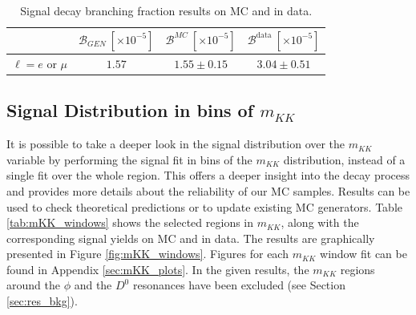 \begin{table}[H]
	\centering
	\begin{tabular}{l|c|c|c}
		& $\mathcal{B}_{GEN}~[\times 10^{-5}]$ & $\mathcal{B}^{MC}~[\times 10^{-5}]$ & $\mathcal{B}^{\mathrm{data}}~[\times 10^{-5}]$ \\
		\toprule
		$\ell = e$ or $\mu$ & $1.57$ & $1.55 \pm 0.15$ & $3.04 \pm 0.51$\\
		\bottomrule
	\end{tabular}
	\captionsetup{width=.8\linewidth}
	\caption{Signal decay branching fraction results on MC and in data.}
	\label{tab:br_result_sig}
\end{table}

\subsection{Signal Distribution in bins of \texorpdfstring{$m_{KK}$}{mKK}}

It is possible to take a deeper look in the signal distribution over the $m_{KK}$ variable by performing the signal fit in bins of the $m_{KK}$ distribution, instead of a single fit over the whole region. This offers a deeper insight into the decay process and provides more details about the reliability of our MC samples. Results can be used to check theoretical predictions or to update existing MC generators. Table \ref{tab:mKK_windows} shows the selected regions in $m_{KK}$, along with the corresponding signal yields on MC and in data. The results are graphically presented in Figure \ref{fig:mKK_windows}. Figures for each $m_{KK}$ window fit can be found in Appendix \ref{sec:mKK_plots}. In the given results, the $m_{KK}$ regions around the $\phi$ and the $D^0$ resonances have been excluded (see Section \ref{sec:res_bkg}).

